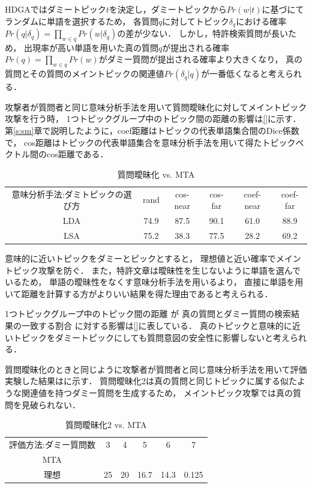 \documentclass[master]{suribt}
\theoremstyle{definition}
\begin{document}
 HDGAではダミートピック$t$を決定し，ダミートピックから$Pr(w|t)$に基づにてランダムに単語を選択するため，
 各質問$q$に対してトピック$\delta_q$における確率$Pr(q|\delta_q) = \prod_{w \in q}Pr(w|\delta_q)$の差が少ない．
 しかし，特許検索質問が長いため，
 出現率が高い単語を用いた真の質問$q$が提出される確率$Pr(q) = \prod_{w \in q}Pr(w)$がダミー質問が提出される確率より大きくなり，
 真の質問とその質問のメイントピックの関連値$Pr(\delta_q|q)$が一番低くなると考えられる．

 攻撃者が質問者と同じ意味分析手法を用いて質問曖昧化に対してメイントピック攻撃を行う時，
 1つトピックグループ中のトピック間の距離の影響は\ref{}に示す．
 第\ref{s:sm}章で説明したように，coef距離はトピックの代表単語集合間のDice係数で，
 cos距離はトピックの代表単語集合を意味分析手法を用いて得たトピックベクトル間のcos距離である．

 \begin{table}[!hbp]
 \center
 \begin{tabular}{|c|c|c|c|c|c|}
 \hline
 意味分析手法:ダミトピックの選び方 & rand & cos-near & cos-far & coef-near & coef-far \\
 LDA & 74.9 & 87.5  & 90.1  & 61.0 & 88.9 \\
 LSA &  75.2 & 38.3 & 77.5 & 28.2 & 69.2 \\
 \hline
 \end{tabular}
 \caption{質問曖昧化 vs. MTA}
 \end{table}

 意味的に近いトピックをダミーとピックとすると，
 理想値と近い確率でメイントピック攻撃を防ぐ．
 また，特許文章は曖昧性を生じないように単語を選んでいるため，
 単語の曖昧性をなくす意味分析手法を用いるより，
 直接に単語を用いて距離を計算する方がよりいい結果を得た理由であると考えられる．

 1つトピックグループ中のトピック間の距離
 が
 真の質問とダミー質問の検索結果の一致する割合
 に対する影響は\ref{}に表している．
 真のトピックと意味的に近いトピックをダミートピックにしても質問意図の安全性に影響しないと考えられる．
 
 質問曖昧化のときと同じように攻撃者が質問者と同じ意味分析手法を用いて評価実験した結果はに示す．
 質問曖昧化2は真の質問と同じトピックに属する似たような関連値を持つダミー質問を生成するため，
 メイントピック攻撃では真の質問を見破られない．

 \begin{table}[!hbp]
 \center
 \begin{tabular}{|c|c|c|c|c|c|}
 \hline
 評価方法:ダミー質問数  & 3 & 4 & 5 & 6 & 7    \\
 MTA &  &  &  &  &  \\
 理想 & 25 & 20 & 16.7 & 14.3 & 0.125 \\
 \hline
 \end{tabular}
 \label{tab:mt:HDGA1}
 \caption{質問曖昧化2 vs. MTA}
 \end{table}
\end{document}
